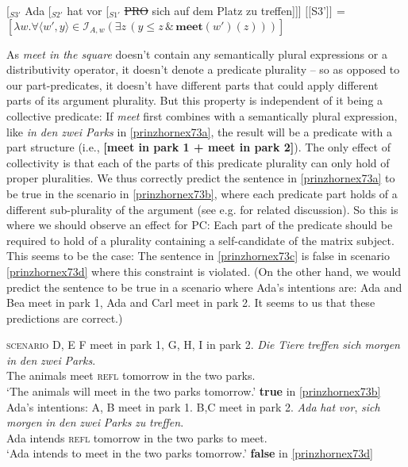\documentclass[output=paper,colorlinks,citecolor=brown,
]{langscibook}
\newcommand{\sem}[2]{\mbox{$[\![${#2}$]\!]^{#1}$}} %
\begin{document}
\ea
\ea   \label{prinzhornex72a} [$_{S3'}$ Ada [$_{S2'}$ hat vor [$_{S1'}$ \sout{PRO} sich auf dem Platz zu treffen]]]
\ex \sem{}{S3'} =  $[\lambda w.  \forall \langle w' ,y \rangle \in \mathcal{I}_{A,w} (\exists z \, (y \le z\, \& \,\textbf{meet}(w')(z)))]$\label{prinzhornex72b}
\z\z

As \textit{meet in the square} doesn't contain any semantically plural expressions or a distributivity operator, it doesn't denote a predicate plurality -- so as opposed to our part-predicates, it doesn't have different parts that could apply different parts of its argument plurality. But this property is independent of it being a collective predicate: If \textit{meet} first combines with a semantically plural expression,  like \textit{in den zwei Parks} in \ref{prinzhornex73a}, the result will be a predicate with a part structure (i.e., \textbf{[meet in park 1 + meet in park 2]}). The only effect of collectivity is that each of the parts of this predicate plurality can only hold of proper pluralities. We  thus correctly predict the sentence in \ref{prinzhornex73a} to be true in the scenario in \ref{prinzhornex73b}, where each predicate part holds of a different sub-plurality of the argument (see e.g. \citealt{Schwarzschild:1996} for related discussion). So this is where we should observe an effect for PC: Each part of the predicate should  be required to hold of a plurality containing a self-candidate of the matrix subject. This  seems to be the case: The sentence in \ref{prinzhornex73c} is false in scenario \ref{prinzhornex73d} where this constraint is violated. (On the other hand, we would predict the sentence to be true in a scenario where Ada's intentions are: Ada and Bea meet in park 1, Ada and Carl meet in park 2. It seems to us that these predictions are correct.)

\ea 
\ea \textsc{scenario}  D, E F meet in park 1, G, H, I in  park 2.  \label{prinzhornex73b}
\ex \gll \textit{Die} \textit{Tiere} \textit{treffen} \textit{sich} \textit{morgen} \textit{in} \textit{den} \textit{zwei} \textit{Parks}.\\
The animals meet \textsc{refl} tomorrow in the two parks.\\
\glt `The animals will meet in the two parks tomorrow.'  \phantom{.}\hfill \textbf{true} in \ref{prinzhornex73b}\label{prinzhornex73a}
\ex Ada's intentions: A, B meet in park 1. B,C meet in park 2. \label{prinzhornex73d}
\ex \gll \textit{Ada} \textit{hat} \textit{vor}, \textit{sich} \textit{morgen} \textit{in} \textit{den} \textit{zwei} \textit{Parks} \textit{zu} \textit{treffen}.\\
Ada intends {} \textsc{refl} tomorrow in the two parks to meet.\\
\glt `Ada intends to meet in the two parks tomorrow.' \label{prinzhornex73c} \phantom{.}\hfill \textbf{false} in \ref{prinzhornex73d} 
\z\z
\end{document}
